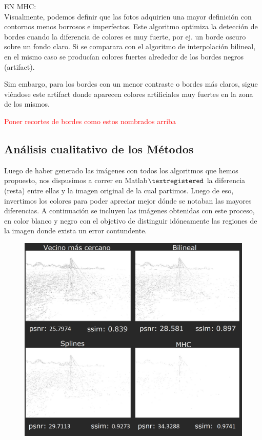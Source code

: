 \documentclass[a4paper]{article}
\begin{document}
EN MHC:\\

Visualmente, podemos definir que las fotos adquirien una mayor definici\'on con contornos menos borrosos e imperfectos. Este algoritmo optimiza la detecci\'on de bordes cuando la diferencia de colores es muy fuerte, por ej. un borde oscuro sobre un fondo claro. Si se comparara con el algoritmo de interpolaci\'on bilineal, en el mismo caso se produc\'ian colores fuertes alrededor de los bordes negros (artifact).

Sim embargo, para los bordes con un menor contraste o bordes m\'as claros, sigue vi\'endose este artifact donde aparecen colores artificiales muy fuertes en la zona de los mismos.

\textcolor{red}{Poner recortes de bordes como estos nombrados arriba}


\newpage
\subsection{An\'alisis cualitativo de los M\'etodos}
Luego de haber generado las im\'agenes con todos los algoritmos que hemos propuesto, nos dispusimos a correr en Matlab$\textregistered$  la diferencia (resta) entre ellas y la imagen original de la cual partimos. Luego de eso, invertimos los colores para poder apreciar mejor d\'onde se notaban las mayores diferencias. A continuaci\'on se incluyen las im\'agenes obtenidas con este proceso, en color blanco y negro con el objetivo de distinguir id\'oneamente las regiones de la imagen donde exista un error contundente.\\


\begin{figure}[h!]
    \caption{}
    \begin{center}
    \includegraphics[scale=0.40]{imagenes/comparacion/02/collage}
    \label{imagen2}
  \end{center}
\end{figure}
\end{document}

